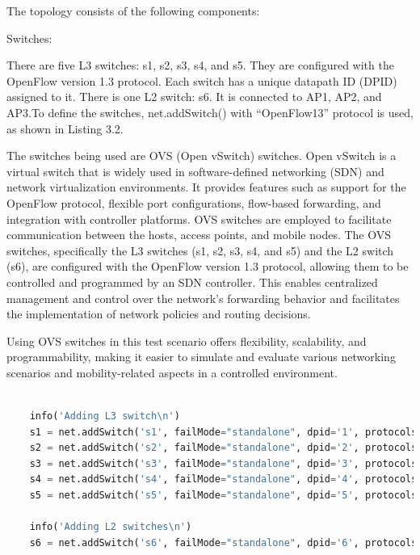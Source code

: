 \documentclass[
  oneside,
  11pt, a4paper,
  footinclude=true,
  headinclude=true,
  cleardoublepage=empty
]{scrbook}
\begin{document}
The topology consists of the following components:


Switches:

There are five L3 switches: s1, s2, s3, s4, and s5. They are configured with the OpenFlow version 1.3 protocol. Each switch has a unique datapath ID (DPID) assigned to it. There is one L2 switch: s6. It is connected to AP1, AP2, and AP3.To define the switches, net.addSwitch() with “OpenFlow13” protocol is used, as shown in
Listing 3.2.
\par
The switches being used are OVS (Open vSwitch) switches. Open vSwitch is a virtual switch that is widely used in software-defined networking (SDN) and network virtualization environments. It provides features such as support for the OpenFlow protocol, flexible port configurations, flow-based forwarding, and integration with controller platforms.
OVS switches are employed to facilitate communication between the hosts, access points, and mobile nodes. The OVS switches, specifically the L3 switches (s1, s2, s3, s4, and s5) and the L2 switch (s6), are configured with the OpenFlow version 1.3 protocol, allowing them to be controlled and programmed by an SDN controller. This enables centralized management and control over the network's forwarding behavior and facilitates the implementation of network policies and routing decisions.

Using OVS switches in this test scenario offers flexibility, scalability, and programmability, making it easier to simulate and evaluate various networking scenarios and mobility-related aspects in a controlled environment.

\par
\begin{lstlisting}[language=Python, caption=Adding Switch]

    info('Adding L3 switch\n')
    s1 = net.addSwitch('s1', failMode="standalone", dpid='1', protocols ='OpenFlow13', cls=OVSKernelSwitch)  
    s2 = net.addSwitch('s2', failMode="standalone", dpid='2', protocols ='OpenFlow13', cls=OVSKernelSwitch)  
    s3 = net.addSwitch('s3', failMode="standalone", dpid='3', protocols ='OpenFlow13', cls=OVSKernelSwitch)  
    s4 = net.addSwitch('s4', failMode="standalone", dpid='4', protocols ='OpenFlow13', cls=OVSKernelSwitch)
    s5 = net.addSwitch('s5', failMode="standalone", dpid='5', protocols ='OpenFlow13', cls=OVSKernelSwitch)

    info('Adding L2 switches\n')
    s6 = net.addSwitch('s6', failMode="standalone", dpid='6', protocols ='OpenFlow13', cls=OVSKernelSwitch) # L2 Switch Net B (no ip)
    

\end{lstlisting}
\end{document}
